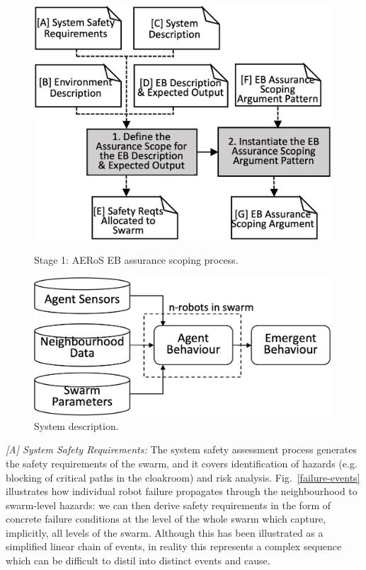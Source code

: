 \documentclass[runningheads]{llncs}
\begin{document}
\begin{figure}
	\vspace{-4ex}
	\centering
	\begin{minipage}{.5\textwidth}
		\centering
		\includegraphics[width=0.99\textwidth]{figures/AMLAS-STAGE-1-V4.png}
		\vspace{-2ex}
		\caption{Stage 1: AERoS EB assurance scoping process.}
		\label{amlas-a-stage1}
	\end{minipage}%
	\begin{minipage}{.5\textwidth}
		\centering
		\includegraphics[width=0.99\textwidth]{figures/stage1-systema-v2.png}
		\vspace{-2ex}
		\caption{System description.}
		\label{system-description}
	\end{minipage}%
	\vspace{-4ex}
\end{figure}

\emph{[A] System Safety Requirements:}
The system safety assessment process generates the safety requirements of the swarm, and it covers identification of hazards (e.g. blocking of critical paths in the cloakroom) and risk analysis.
Fig.~\ref{failure-events} illustrates how individual robot failure propagates through the neighbourhood to swarm-level hazards: we can then derive safety requirements in the form of concrete failure conditions at the level of the whole swarm which capture, implicitly, all levels of the swarm. 
Although this has been illustrated as a simplified linear chain of events, in reality this represents a complex sequence which can be difficult to distil into distinct events and cause. 
\end{document}

